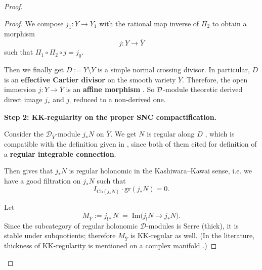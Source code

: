 \begin{remark}
\begin{proof}
\begin{enumerate}
\begin{proof}
                      We compose $j_1: Y\to \overline Y_1$ with the rational map inverse of $\Pi_2$ to obtain a morphism
                      \[
                          j: Y \to \overline Y
                      \]
                      such that $\Pi_1 \circ \Pi_2 \circ j = j_0$.

                      Then we finally get $D := \overline Y\setminus Y$ is a simple normal crossing divisor.
                      In particular, $D$ is an \textbf{effective Cartier divisor} on the smooth variety $\overline Y$.
                      Therefore, the open immersion $j: Y \to \overline Y$ is an \textbf{affine morphism} \cite[\href{https://stacks.math.columbia.edu/tag/01WR}{Tag 01WR}, \href{https://stacks.math.columbia.edu/tag/01WS}{Tag 01WS}]{stacks-project}.
                      So $\mathcal{D}$-module theoretic derived direct image $j_*$ and $j_!$ reduced to a non-derived one.

                      \medskip

                      \textbf{Step 2: KK-regularity on the proper SNC compactification.}

                      Consider the $\mathcal D_{\overline Y}$-module $j_*N$ on $\overline Y$.
                      We get $N$ is regular along $D$ \cite[Thm~5.3.8. and Thm~5.2.20.]{hotta2008d},
                      which is compatible with the definition given in \cite{cailotto_fiorot_2015_algebraic_connections_vs_dmodules},
                      since both of them cited \cite{DeligneLNM163} for definition of a \textbf{regular integrable connection}.

                      Then \cite[Thm.~3.1.]{cailotto_fiorot_2015_algebraic_connections_vs_dmodules} gives that
                      $j_*N$ is regular holonomic in the Kashiwara--Kawai sense,
                      i.e. we have a good filtration on $j_*N$ such that
                      \[
                          I_{\mathrm{Ch}(j_*N)}\cdot \mathrm{gr}(j_*N)=0.
                      \]

                      Let
                      \[
                          M_{\overline Y} := j_{!*}N \;=\; \mathrm{Im}\bigl(j_!N \to j_*N \bigr).
                      \]
                      Since the subcategory of regular holonomic $\mathcal D$-modules is Serre (thick),
                      it is stable under subquotients; therefore $M_{\overline Y}$ is KK-regular as well.
                      (In the literature, thickness of KK-regularity is mentioned on a complex manifold \cite[Discussion~below~Def.~4.1.1.]{KashiwaraSchapira_RegIrrDmod_2015}.)


\end{proof}
\end{enumerate}
\end{proof}
\end{remark}
